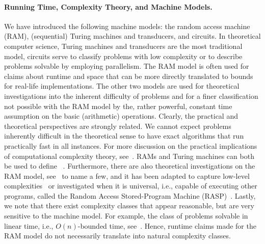 \paragraph{Running Time, Complexity Theory, and Machine Models.} 
We have introduced the following machine models: the random access machine (RAM), (sequential) Turing machines and transducers, and circuits. 
In theoretical computer science, Turing machines and transducers
are the most traditional model,
circuits serve to classify problems with low complexity or to describe problems solvable by employing parallelism. 
The RAM model is often used for claims about runtime and space that can be more directly translated
to bounds for real-life implementations. The other two models
are used for theoretical investigations into the inherent difficulty
of problems and for a finer classification
not possible with the RAM model by the, rather powerful, constant time assumption on the basic (arithmetic)
operations. Clearly, the practical and theoretical perspectives are strongly related. We cannot 
expect problems inherently difficult in the theoretical sense to have exact algorithms that run practically fast in all instances.
For more discussion on the practical implications of 
computational complexity theory, see~\cite{DBLP:books/ws/phaunRS01/Allender01}.
RAMs and Turing machines can both be used to define \PTIME~\cite{DBLP:journals/jcss/CookR73}.
Furthermore, there are also theoretical investigations on the RAM model, see~\cite{DBLP:journals/jcss/AngluinV79,DBLP:journals/mst/Hartmanis71,DBLP:journals/siamcomp/KatajainenLP88,DBLP:journals/mst/LouiL92,Penttonen-1999,DBLP:journals/jacm/ShepherdsonS63,DBLP:journals/siamcomp/SudboroughZ76} to name a few,
and it has been adapted to capture low-level complexities~\cite{DBLP:journals/jcss/AngluinV79,DBLP:conf/ershov/GurevichS89,Kasai77}
or investigated when it is universal, i.e., capable of executing other programs, called
the Random Access Stored-Program Machine (RASP)~\cite{DBLP:journals/mst/Hartmanis71,DBLP:journals/jcss/CookR73}.
Lastly, we note that there exist complexity classes that 
appear reasonable, but are very sensitive to the machine model.
For example, the class of problems solvable in linear time, i.e., $O(n)$-bounded time, see~\cite{DBLP:conf/ershov/GurevichS89}.
Hence, runtime claims made for the RAM model do not necessarily
translate into natural complexity classes. 
 
